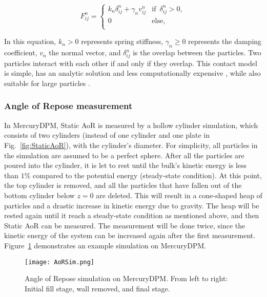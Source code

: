 \begin{equation}
    F_{ij}^n=\begin{cases}
        k_n \delta_{ij}^n + \gamma_n v_{ij}^n &\text{if } \, \delta_{ij}^n > 0, \\
        0 \quad &\text{else, } \,   \\
   \end{cases}
\end{equation}

In this equation, $k_n > 0$ represents spring stiffness, $\gamma_n \geq 0$ represents the damping coefficient, $v_n$ the normal vector, and $\delta_{ij}^n$ is the overlap between the particles. Two particles interact with each other if and only if they overlap. This contact model is simple, has an analytic solution and less computationally expensive \cite{NAVARRO2013}, while also suitable for large particles \cite{MercuryDPM}. 


\subsubsection{Angle of Repose measurement}

In MercuryDPM, Static AoR is measured by a hollow cylinder simulation, which consists of two cylinders (instead of one cylinder and one plate in Fig.~\ref{fig:StaticAoR}), with the cylinder's diameter. For simplicity, all particles in the simulation are assumed to be a perfect sphere. After all the particles are poured into the cylinder, it is let to rest until the bulk's kinetic energy is less than $1\%$ compared to the potential energy (steady-state condition). At this point, the top cylinder is removed, and all the particles that have fallen out of the bottom cylinder below $z = 0$ are deleted. This will result in a cone-shaped heap of particles and a drastic increase in kinetic energy due to gravity. The heap will be rested again until it reach a steady-state condition as mentioned above, and then Static AoR can be measured. The measurement will be done twice, since the kinetic energy of the system can be increased again after the first measurement. Figure~\ref{fig:MercuryAoR} demonstrates an example simulation on MercuryDPM.    



\begin{figure}[H]
    \centering
    \texttt{[image: AoRSim.png]}
    \caption{Angle of Repose simulation on MercuryDPM. From left to right: Initial fill stage, wall removed, and final stage.}\label{fig:MercuryAoR}
\end{figure}
